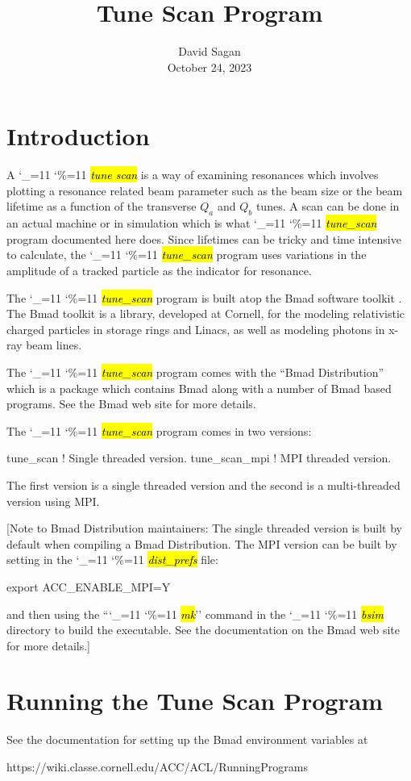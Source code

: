 \documentclass{hitec}
\title{Tune Scan Program}
\author{}
\date{David Sagan \\ October 24, 2023}
\newcommand\dottcmd[1]{\hl{\em#1}\endgroup}
\newcommand{\vn}{\begingroup\catcode`\_=11 \catcode`\%=11 \dottcmd}
\newcommand{\ts}{\vn{tune_scan}\xspace}
\newcommand{\Section}[1]{\section{#1}\vspace*{-1ex}}
\begin{document}
\maketitle

\tableofcontents


\Section{Introduction} 
\label{s:intro}

A \vn{tune scan} is a way of examining resonances which involves plotting a resonance related beam
parameter such as the beam size or the beam lifetime as a function of the transverse $Q_a$ and $Q_b$
tunes.  A scan can be done in an actual machine or in simulation which is what \ts program documented here
does. Since lifetimes can be tricky and time intensive to calculate, the \ts program uses variations in the
amplitude of a tracked particle as the indicator for resonance.

The \ts program is built atop the Bmad software toolkit \cite{b:bmad}. The Bmad toolkit is a
library, developed at Cornell, for the modeling relativistic charged particles in storage rings and
Linacs, as well as modeling photons in x-ray beam lines.

The \ts program comes with the ``Bmad Distribution'' which is a package which contains Bmad along with
a number of Bmad based programs. See the Bmad web site for more details.

The \ts program comes in two versions: 
\begin{code}
tune_scan      ! Single threaded version.
tune_scan_mpi  ! MPI threaded version.
\end{code}
The first version is a single threaded version and the second is a multi-threaded version using MPI.

[Note to Bmad Distribution maintainers: The single threaded version is built by default when compiling a Bmad
Distribution. The MPI version can be built by setting in the \vn{dist_prefs} file:
\begin{code}
  export ACC_ENABLE_MPI=Y
\end{code}
and then using the ``\vn{mk}'' command in the \vn{bsim} directory to build the executable. See the
documentation on the Bmad web site for more details.]

\Section{Running the Tune Scan Program} 
\label{s:run}

See the documentation for setting up the Bmad environment variables at
\begin{code}
https://wiki.classe.cornell.edu/ACC/ACL/RunningPrograms
\end{code}
\end{document}
